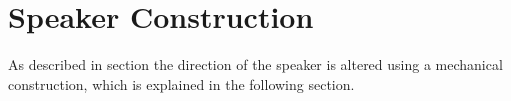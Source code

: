 \chapter{Speaker Construction}
%
As described in section  the direction of the speaker is altered using a mechanical construction, which is explained in the following section.
%

